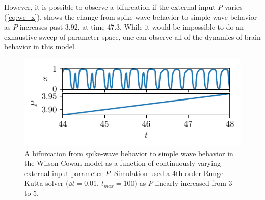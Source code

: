 However, it is possible to observe a bifurcation if the external input $P$ varies (\cref{eq:wc_x}).
 shows the change from spike-wave behavior to simple wave behavior as $P$ increases past 3.92, at time 47.3.
While it would be impossible to do an exhaustive sweep of parameter space, one can observe all of the dynamics of brain behavior in this model.
\begin{figure}[ht]
  \centering
  \includegraphics{figure/wc_bifurcation}
  \caption[Wilson-Cowan bifurcation]{A bifurcation from spike-wave behavior to simple wave behavior in the Wilson-Cowan model as a function of continuously varying external input parameter $P$.
    Simulation used a 4th-order Runge-Kutta solver ($\dd{t} = 0.01$, $t_{max} = 100$) as $P$ linearly increased from 3 to 5.
  }
  \label{fig:wc_bifurcation}
\end{figure}

